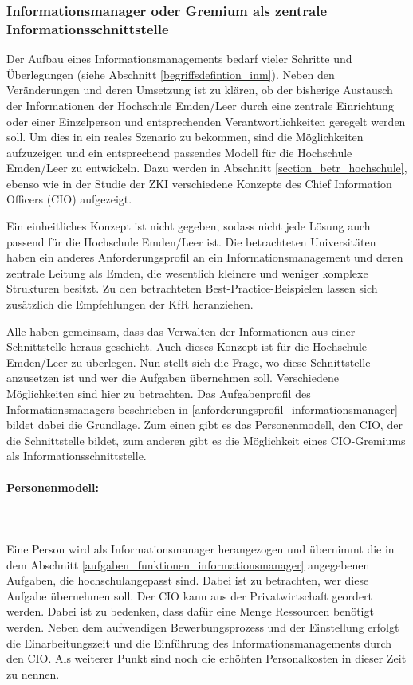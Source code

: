 \subsubsection{Informationsmanager oder Gremium als zentrale Informationsschnittstelle}
\label{subsubsection_cio_gremium}

Der Aufbau eines Informationsmanagements bedarf vieler Schritte und Überlegungen (siehe Abschnitt \ref{begriffsdefintion_inm}). Neben den Veränderungen und deren Umsetzung ist zu klären, ob der bisherige Austausch der Informationen der Hochschule Emden/Leer durch eine zentrale Einrichtung oder einer Einzelperson und entsprechenden Verantwortlichkeiten geregelt werden soll. Um dies in ein reales Szenario zu bekommen, sind die Möglichkeiten aufzuzeigen und ein entsprechend passendes Modell für die Hochschule Emden/Leer zu entwickeln. Dazu werden in Abschnitt  \ref{section_betr_hochschule}, ebenso wie in der Studie der ZKI verschiedene Konzepte des Chief Information Officers (CIO) aufgezeigt. 

Ein einheitliches Konzept ist nicht gegeben, sodass nicht jede Lösung auch passend für die Hochschule Emden/Leer ist. Die betrachteten Universitäten haben ein anderes Anforderungsprofil an ein Informationsmanagement und deren zentrale Leitung als Emden, die wesentlich kleinere und weniger komplexe Strukturen besitzt. Zu den betrachteten Best-Practice-Beispielen lassen sich zusätzlich die Empfehlungen der KfR heranziehen. 

Alle haben gemeinsam, dass das Verwalten der Informationen aus einer Schnittstelle heraus geschieht. Auch dieses Konzept ist für die Hochschule Emden/Leer zu überlegen. Nun stellt sich die Frage, wo diese Schnittstelle anzusetzen ist und wer die Aufgaben übernehmen soll. 
Verschiedene Möglichkeiten sind hier zu betrachten. Das Aufgabenprofil des Informationsmanagers beschrieben in \ref{anforderungsprofil_informationsmanager} bildet dabei die Grundlage. Zum einen gibt es das Personenmodell, den CIO,  der die Schnittstelle bildet, zum anderen gibt es die Möglichkeit eines CIO-Gremiums als Informationsschnittstelle. 

\paragraph*{Personenmodell:}\mbox{}\\\\
Eine Person wird als Informationsmanager herangezogen und übernimmt die in dem Abschnitt \ref{aufgaben_funktionen_informationsmanager} angegebenen Aufgaben, die hochschulangepasst sind. Dabei ist zu betrachten, wer diese Aufgabe übernehmen soll. Der CIO kann aus der Privatwirtschaft geordert werden. Dabei ist zu bedenken, dass dafür eine Menge Ressourcen benötigt werden. Neben dem aufwendigen Bewerbungsprozess und der Einstellung erfolgt die Einarbeitungszeit und die Einführung des Informationsmanagements durch den CIO. Als weiterer Punkt sind noch die erhöhten Personalkosten in dieser Zeit zu nennen.

